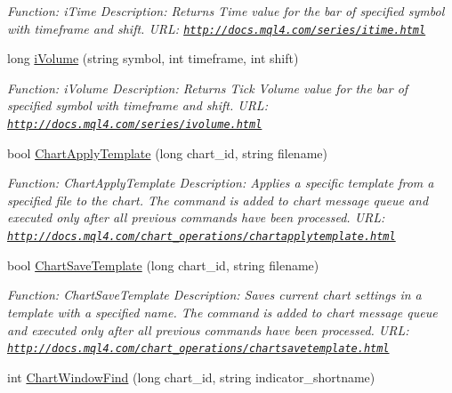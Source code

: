 \begin{DoxyCompactItemize}
\begin{DoxyCompactList}\small\item\em Function\+: i\+Time Description\+: Returns Time value for the bar of specified symbol with timeframe and shift. U\+RL\+: \href{http://docs.mql4.com/series/itime.html}{\tt http\+://docs.\+mql4.\+com/series/itime.\+html} \end{DoxyCompactList}\item 
long \hyperlink{class_m_q_l4_c_sharp_1_1_base_1_1_m_q_l_base_a6f0d934a42cd3335eb8c9015e7534bea}{i\+Volume} (string symbol, int timeframe, int shift)
\begin{DoxyCompactList}\small\item\em Function\+: i\+Volume Description\+: Returns Tick Volume value for the bar of specified symbol with timeframe and shift. U\+RL\+: \href{http://docs.mql4.com/series/ivolume.html}{\tt http\+://docs.\+mql4.\+com/series/ivolume.\+html} \end{DoxyCompactList}\item 
bool \hyperlink{class_m_q_l4_c_sharp_1_1_base_1_1_m_q_l_base_a7515c70736b352c1799846d838afdf73}{Chart\+Apply\+Template} (long chart\+\_\+id, string filename)
\begin{DoxyCompactList}\small\item\em Function\+: Chart\+Apply\+Template Description\+: Applies a specific template from a specified file to the chart. The command is added to chart message queue and executed only after all previous commands have been processed. U\+RL\+: \href{http://docs.mql4.com/chart_operations/chartapplytemplate.html}{\tt http\+://docs.\+mql4.\+com/chart\+\_\+operations/chartapplytemplate.\+html} \end{DoxyCompactList}\item 
bool \hyperlink{class_m_q_l4_c_sharp_1_1_base_1_1_m_q_l_base_a3bc1f335ba3c56950198a0df75e5ec4a}{Chart\+Save\+Template} (long chart\+\_\+id, string filename)
\begin{DoxyCompactList}\small\item\em Function\+: Chart\+Save\+Template Description\+: Saves current chart settings in a template with a specified name. The command is added to chart message queue and executed only after all previous commands have been processed. U\+RL\+: \href{http://docs.mql4.com/chart_operations/chartsavetemplate.html}{\tt http\+://docs.\+mql4.\+com/chart\+\_\+operations/chartsavetemplate.\+html} \end{DoxyCompactList}\item 
int \hyperlink{class_m_q_l4_c_sharp_1_1_base_1_1_m_q_l_base_a45e06c31486ef2c5642971342b588fb0}{Chart\+Window\+Find} (long chart\+\_\+id, string indicator\+\_\+shortname)

\end{DoxyCompactItemize}
